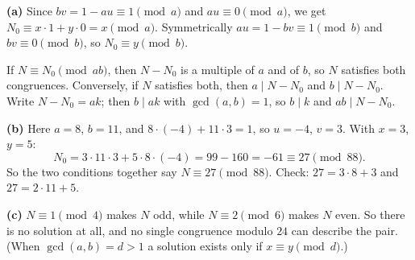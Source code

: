 \textbf{(a)} Since $bv=1-au\equiv1\pmod a$ and $au\equiv0\pmod a$, we get $N_0\equiv x\cdot1+y\cdot0=x\pmod a$. Symmetrically $au=1-bv\equiv1\pmod b$ and $bv\equiv0\pmod b$, so $N_0\equiv y\pmod b$.

If $N\equiv N_0\pmod{ab}$, then $N-N_0$ is a multiple of $a$ and of $b$, so $N$ satisfies both congruences. Conversely, if $N$ satisfies both, then $a\mid N-N_0$ and $b\mid N-N_0$. Write $N-N_0=ak$; then $b\mid ak$ with $\gcd(a,b)=1$, so $b\mid k$ and $ab\mid N-N_0$.

\textbf{(b)} Here $a=8$, $b=11$, and $8\cdot(-4)+11\cdot3=1$, so $u=-4$, $v=3$. With $x=3$, $y=5$:
\[
N_0=3\cdot11\cdot3+5\cdot8\cdot(-4)=99-160=-61\equiv27\pmod{88}.
\]
So the two conditions together say $\boxed{N\equiv27\pmod{88}}$. Check: $27=3\cdot8+3$ and $27=2\cdot11+5$.

\textbf{(c)} $N\equiv1\pmod4$ makes $N$ odd, while $N\equiv2\pmod6$ makes $N$ even. So there is no solution at all, and no single congruence modulo $24$ can describe the pair. (When $\gcd(a,b)=d>1$ a solution exists only if $x\equiv y\pmod d$.)
